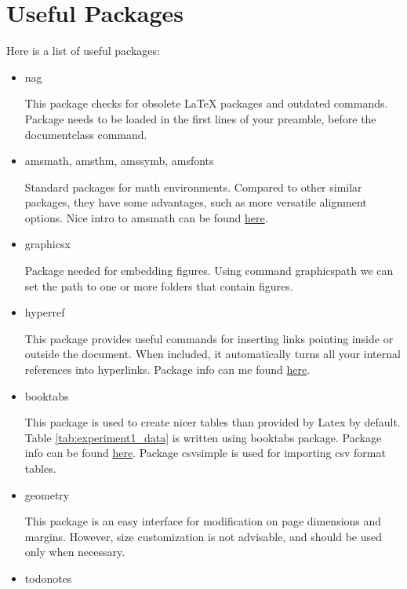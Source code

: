 \section{Useful Packages}
\label{sec:packages}

Here is a list of useful packages:
\begin{itemize}
	\item{nag}
	
	This package checks for obsolete LaTeX packages and outdated commands. Package needs to be loaded in the first lines of your preamble, before the documentclass command.
	
	\item{amsmath, amsthm, amssymb, amsfonts}
	
	Standard packages for math environments. Compared to other similar packages, they have some advantages, such as more versatile alignment options. Nice intro to amsmath can be found \href{https://www.sharelatex.com/learn/Aligning_equations_with_amsmath}{here}.
		
	\item{graphicsx}
	
	Package needed for embedding figures. Using command graphicspath we can set the path to one or more folders that contain figures. 
			
	\item{hyperref}
	
	This package provides useful commands for inserting links pointing inside or outside the document. When included, it automatically turns all your internal references into hyperlinks. Package info can me found \href{https://en.wikibooks.org/wiki/LaTeX/Hyperlinks}{here}.
	
	\item{booktabs}
	
	This package is used to create nicer tables than provided by Latex by default. Table \ref{tab:experiment1_data} is written using booktabs package. Package info can be found \href{http://ctan.ijs.si/tex-archive/macros/latex/contrib/booktabs/booktabs.pdf}{here}.  Package csvsimple is used for importing csv format tables.
	
	\item{geometry}
	
	This package is an easy interface for modification on page dimensions and margins. However, size customization is not advisable, and should be used only when necessary.
	
	\item{todonotes}
	

\end{itemize}
